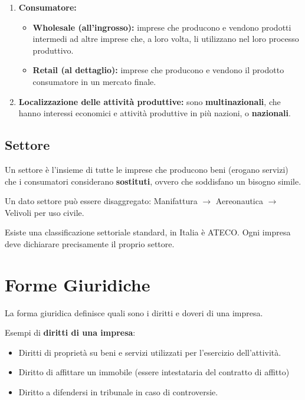 \documentclass[../main.tex]{subfiles}
\begin{document}
\begin{enumerate}
\item \textbf{Consumatore:}
	\begin{itemize}
	\item
	\textbf{Wholesale (all'ingrosso):} imprese che producono e vendono prodotti intermedi ad altre imprese che, a loro volta, li utilizzano nel loro processo produttivo.
	\item \textbf{Retail (al dettaglio):} imprese che producono e vendono il prodotto consumatore in un mercato finale.
	\end{itemize}

\item \textbf{Localizzazione delle attività produttive:} sono \textbf{multinazionali}, che hanno interessi economici e attività produttive in più nazioni, o \textbf{nazionali}.

\end{enumerate}

\subsection{Settore}

Un settore è l'insieme di tutte le imprese che producono beni (erogano servizi) che i consumatori considerano \textbf{sostituti}, ovvero che soddisfano un bisogno simile.

Un dato settore può essere disaggregato: Manifattura $\rightarrow$ Aereonautica $\rightarrow$ Velivoli per uso civile.

Esiste una classificazione settoriale standard, in Italia è ATECO. Ogni impresa deve dichiarare precisamente il proprio settore.


\section{Forme Giuridiche}

La forma giuridica definisce quali sono i diritti e doveri di una impresa.

Esempi di \textbf{diritti di una impresa}:
\begin{itemize}
\item
Diritti di proprietà su beni e servizi utilizzati per l'esercizio dell'attività.
\item Diritto di affittare un immobile (essere intestataria del contratto di affitto)
\item Diritto a difendersi in tribunale in caso di controversie.
\end{itemize}
\end{document}
